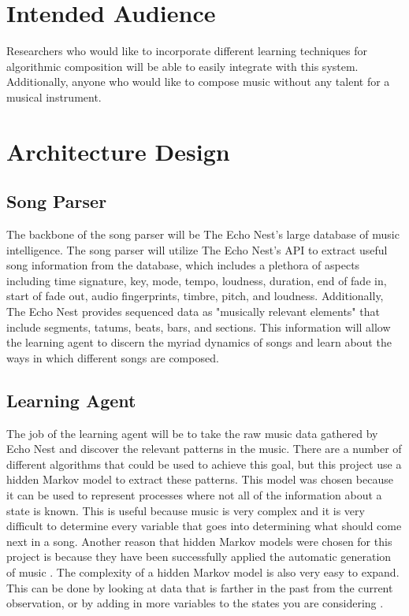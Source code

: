 \documentclass{article}
\begin{document}
\section{Intended Audience}
Researchers who would like to incorporate different learning techniques for algorithmic composition will be able to easily integrate with this system. Additionally, anyone who would like to compose music without any talent for a musical instrument.

\section{Architecture Design}
\subsection{Song Parser}
The backbone of the song parser will be The Echo Nest's large database of music intelligence. The song parser will utilize The Echo Nest's API to extract useful song information from the database, which includes a plethora of aspects including time signature, key, mode, tempo, loudness, duration, end of fade in, start of fade out, audio fingerprints, timbre, pitch, and loudness. Additionally, The Echo Nest provides sequenced data as "musically relevant elements" that include segments, tatums, beats, bars, and sections. This information will allow the learning agent to discern the myriad dynamics of songs and learn about the ways in which different songs are composed.

\subsection{Learning Agent}
The job of the learning agent will be to take the raw music data gathered by Echo Nest and discover the relevant patterns in the music. There are a number of different algorithms that could be used to achieve this goal, but this project use a hidden Markov model to extract these patterns. This model was chosen because it can be used to represent processes where not all of the information about a state is known. This is useful because music is very complex and it is very difficult to determine every variable that goes into determining what should come next in a song. Another reason that hidden Markov models were chosen for this project is because they have been successfully applied the automatic generation of music \cite{5492670}. The complexity of a hidden Markov model is also very easy to expand. This can be done by looking at data that is farther in the past from the current observation, or by adding in more variables to the states you are considering \cite{Wiki}.\\
\end{document}
